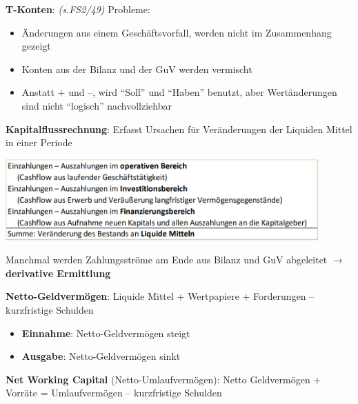 \textbf{T-Konten}: \textit{(s.FS2/49)} Probleme:
\begin{itemize}
	\item Änderungen aus einem Geschäftsvorfall, werden nicht im Zusammenhang gezeigt
	\item Konten aus der Bilanz und der GuV werden vermischt
	\item Anstatt $+$ und $–$, wird \enquote{Soll} und \enquote{Haben} benutzt, aber Wertänderungen sind nicht \enquote{logisch} nachvollziehbar
\end{itemize}
\bigskip
\textbf{Kapitalflussrechnung}: Erfasst Ursachen für Veränderungen der Liquiden Mittel in einer Periode
\begin{center}
	\includegraphics[width=0.9\textwidth]{images/kfr.png}
\end{center}
Manchmal werden Zahlungsströme am Ende aus Bilanz und GuV abgeleitet $\rightarrow$ \textbf{derivative Ermittlung}

\pagebreak
\textbf{Netto-Geldvermögen}: Liquide Mittel + Wertpapiere + Forderungen $–$ kurzfristige Schulden
\begin{itemize}
	\item \textbf{Einnahme}: Netto-Geldvermögen steigt
	\item \textbf{Ausgabe}: Netto-Geldvermögen sinkt
\end{itemize}
\bigskip
\textbf{Net Working Capital} (Netto-Umlaufvermögen): Netto Geldvermögen + Vorräte = Umlaufvermögen $–$ kurzfristige Schulden\\

